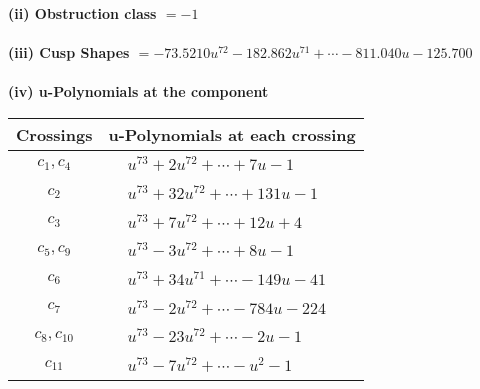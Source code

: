 \documentclass[1p]{elsarticle_modified}
\theoremstyle{definition}
\begin{document}
\flushleft \textbf{(ii) Obstruction class $= -1$}\\~\\
\flushleft \textbf{(iii) Cusp Shapes $= -73.5210 u^{72}-182.862 u^{71}+\cdots-811.040 u-125.700$}\\~\\
\newpage\renewcommand{\arraystretch}{1}
\flushleft \textbf{(iv) u-Polynomials at the component}\newline \\
\begin{tabular}{m{50pt}|m{274pt}}
Crossings & \hspace{64pt}u-Polynomials at each crossing \\
\hline $$\begin{aligned}c_{1},c_{4}\end{aligned}$$&$\begin{aligned}
&u^{73}+2 u^{72}+\cdots+7 u-1
\end{aligned}$\\
\hline $$\begin{aligned}c_{2}\end{aligned}$$&$\begin{aligned}
&u^{73}+32 u^{72}+\cdots+131 u-1
\end{aligned}$\\
\hline $$\begin{aligned}c_{3}\end{aligned}$$&$\begin{aligned}
&u^{73}+7 u^{72}+\cdots+12 u+4
\end{aligned}$\\
\hline $$\begin{aligned}c_{5},c_{9}\end{aligned}$$&$\begin{aligned}
&u^{73}-3 u^{72}+\cdots+8 u-1
\end{aligned}$\\
\hline $$\begin{aligned}c_{6}\end{aligned}$$&$\begin{aligned}
&u^{73}+34 u^{71}+\cdots-149 u-41
\end{aligned}$\\
\hline $$\begin{aligned}c_{7}\end{aligned}$$&$\begin{aligned}
&u^{73}-2 u^{72}+\cdots-784 u-224
\end{aligned}$\\
\hline $$\begin{aligned}c_{8},c_{10}\end{aligned}$$&$\begin{aligned}
&u^{73}-23 u^{72}+\cdots-2 u-1
\end{aligned}$\\
\hline $$\begin{aligned}c_{11}\end{aligned}$$&$\begin{aligned}
&u^{73}-7 u^{72}+\cdots- u^2-1
\end{aligned}$\\
\hline
\end{tabular}\\~\\
\end{document}
